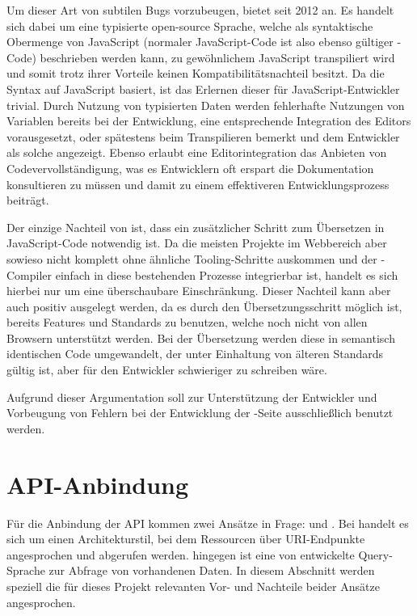 Um dieser Art von subtilen Bugs vorzubeugen, bietet  seit 2012  an. Es handelt sich dabei um eine typisierte open-source Sprache, welche als syntaktische Obermenge von JavaScript (normaler JavaScript-Code ist also ebenso gültiger -Code) beschrieben werden kann, zu gewöhnlichem JavaScript transpiliert wird und somit trotz ihrer Vorteile keinen Kompatibilitätsnachteil besitzt. Da die Syntax auf JavaScript basiert, ist das Erlernen dieser für JavaScript-Entwickler trivial. Durch Nutzung von typisierten Daten werden fehlerhafte Nutzungen von Variablen bereits bei der Entwicklung, eine entsprechende Integration des Editors vorausgesetzt, oder spätestens beim Transpilieren bemerkt und dem Entwickler als solche angezeigt. Ebenso erlaubt eine Editorintegration das Anbieten von Codevervollständigung, was es Entwicklern oft erspart die Dokumentation konsultieren zu müssen und damit zu einem effektiveren Entwicklungsprozess beiträgt.

Der einzige Nachteil von  ist, dass ein zusätzlicher Schritt zum Übersetzen in JavaScript-Code notwendig ist. Da die meisten Projekte im Webbereich aber sowieso nicht komplett ohne ähnliche Tooling-Schritte auskommen und der -Compiler einfach in diese bestehenden Prozesse integrierbar ist, handelt es sich hierbei nur um eine überschaubare Einschränkung. Dieser Nachteil kann aber auch positiv ausgelegt werden, da es durch den Übersetzungsschritt möglich ist, bereits Features und Standards zu benutzen, welche noch nicht von allen Browsern unterstützt werden. Bei der Übersetzung werden diese in semantisch identischen Code umgewandelt, der unter Einhaltung von älteren Standards gültig ist, aber für den Entwickler schwieriger zu schreiben wäre. 

Aufgrund dieser Argumentation soll zur Unterstützung der Entwickler und Vorbeugung von Fehlern bei der Entwicklung der -Seite ausschließlich  benutzt werden. 

\section{API-Anbindung}
Für die Anbindung der API kommen zwei Ansätze in Frage:  und \@. Bei  handelt es sich um einen Architekturstil, bei dem Ressourcen über URI-Endpunkte angesprochen und abgerufen werden.  hingegen ist eine von  entwickelte Query-Sprache zur Abfrage von vorhandenen Daten. In diesem Abschnitt werden speziell die für dieses Projekt relevanten Vor- und Nachteile beider Ansätze angesprochen.

